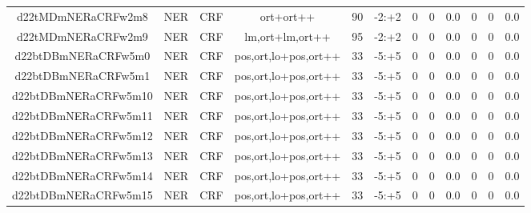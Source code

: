 \documentclass[a4paper]{article}
\begin{document}
\begin{landscape}
\begin{center}
\begin{tabular}{ |c|c|c|c|c|c|c|c|c|c|c|c|}
 
 	
 	\small{ d22tMDmNERaCRFw2m8 } & \small{ NER} & \small{  CRF }  & ort+ort++  &  90 &  \small{  -2:+2 }  &  0 & 0 & 0.0  &  0 & 0 & 0.0 \\
 	

 
 	
 	\small{ d22tMDmNERaCRFw2m9 } & \small{ NER} & \small{  CRF }  & lm,ort+lm,ort++  &  95 &  \small{  -2:+2 }  &  0 & 0 & 0.0  &  0 & 0 & 0.0 \\
 	

 
 	
 	\small{ d22btDBmNERaCRFw5m0 } & \small{ NER} & \small{  CRF }  & pos,ort,lo+pos,ort++  &  33 &  \small{  -5:+5 }  &  0 & 0 & 0.0  &  0 & 0 & 0.0 \\
 	

 
 	
 	\small{ d22btDBmNERaCRFw5m1 } & \small{ NER} & \small{  CRF }  & pos,ort,lo+pos,ort++  &  33 &  \small{  -5:+5 }  &  0 & 0 & 0.0  &  0 & 0 & 0.0 \\
 	

 
 	
 	\small{ d22btDBmNERaCRFw5m10 } & \small{ NER} & \small{  CRF }  & pos,ort,lo+pos,ort++  &  33 &  \small{  -5:+5 }  &  0 & 0 & 0.0  &  0 & 0 & 0.0 \\
 	

 
 	
 	\small{ d22btDBmNERaCRFw5m11 } & \small{ NER} & \small{  CRF }  & pos,ort,lo+pos,ort++  &  33 &  \small{  -5:+5 }  &  0 & 0 & 0.0  &  0 & 0 & 0.0 \\
 	

 
 	
 	\small{ d22btDBmNERaCRFw5m12 } & \small{ NER} & \small{  CRF }  & pos,ort,lo+pos,ort++  &  33 &  \small{  -5:+5 }  &  0 & 0 & 0.0  &  0 & 0 & 0.0 \\
 	

 
 	
 	\small{ d22btDBmNERaCRFw5m13 } & \small{ NER} & \small{  CRF }  & pos,ort,lo+pos,ort++  &  33 &  \small{  -5:+5 }  &  0 & 0 & 0.0  &  0 & 0 & 0.0 \\
 	

 
 	
 	\small{ d22btDBmNERaCRFw5m14 } & \small{ NER} & \small{  CRF }  & pos,ort,lo+pos,ort++  &  33 &  \small{  -5:+5 }  &  0 & 0 & 0.0  &  0 & 0 & 0.0 \\
 	

 
 	
 	\small{ d22btDBmNERaCRFw5m15 } & \small{ NER} & \small{  CRF }  & pos,ort,lo+pos,ort++  &  33 &  \small{  -5:+5 }  &  0 & 0 & 0.0  &  0 & 0 & 0.0 \\
 	


\end{tabular}
\end{center}
\end{landscape}
\end{document}
